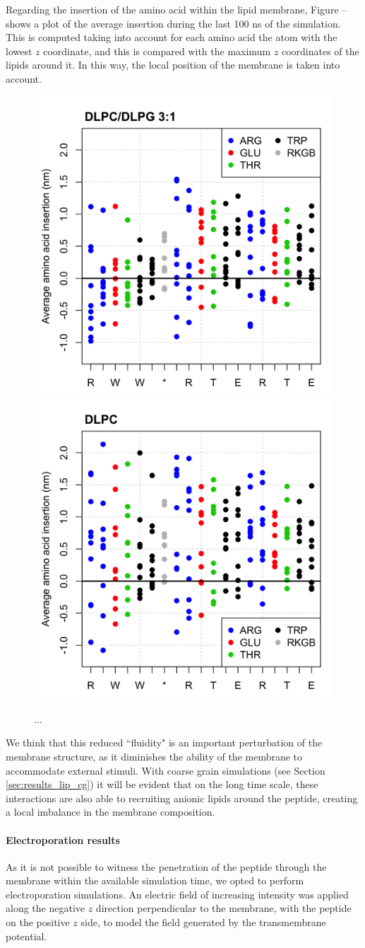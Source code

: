 Regarding the insertion of the amino acid within the lipid membrane, Figure -- shows a plot of the average insertion during the last 100 ns of the simulation. This is computed taking into account for each amino acid the atom with the lowest $z$ coordinate, and this is compared with the maximum $z$ coordinates of the lipids around it. In this way, the local position of the membrane is taken into account.
%
\begin{figure}[h!]
\centering
\includegraphics[width=0.5\linewidth]{3results_capsule/pics/pL6_avg_depth_mix.png} 
\includegraphics[width=0.5\linewidth]{3results_capsule/pics/pZ11_avg_depth_mix.png} 
\caption[ggg]{...}
\label{nnn}
\end{figure}

We think that this reduced ``fluidity" is an important perturbation of the membrane structure, as it diminishes the ability of the membrane to accommodate external stimuli. With coarse grain simulations (see Section \ref{sec:results_lip_cg}) it will be evident that on the long time scale, these interactions are also able to recruiting anionic lipids around the peptide, creating a local imbalance in the membrane composition.


\paragraph{Electroporation results}
As it is not possible to witness the penetration of the peptide through the membrane within the available simulation time, we opted to perform electroporation simulations.
%
An electric field of increasing intensity was applied along the negative $z$ direction perpendicular to the membrane, with the peptide on the positive $z$ side, to model the field generated by the transmembrane potential.

